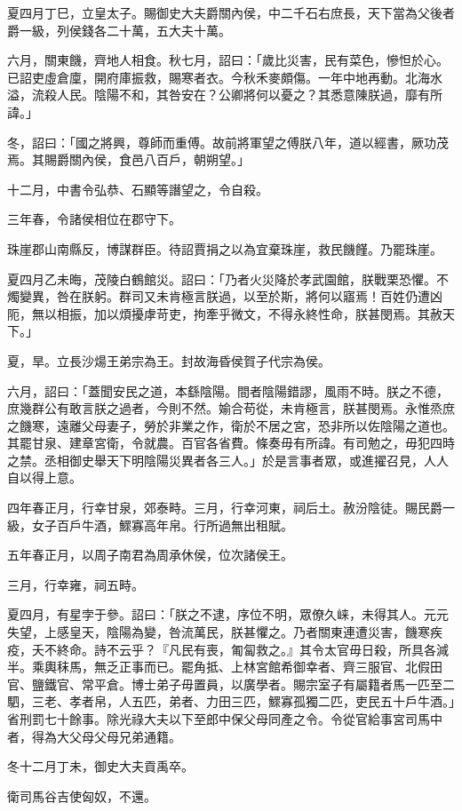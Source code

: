 \begin{pinyinscope}
夏四月丁巳，立皇太子。賜御史大夫爵關內侯，中二千石右庶長，天下當為父後者爵一級，列侯錢各二十萬，五大夫十萬。

六月，關東饑，齊地人相食。秋七月，詔曰：「歲比災害，民有菜色，慘怛於心。已詔吏虛倉廩，開府庫振救，賜寒者衣。今秋禾麥頗傷。一年中地再動。北海水溢，流殺人民。陰陽不和，其咎安在？公卿將何以憂之？其悉意陳朕過，靡有所諱。」

冬，詔曰：「國之將興，尊師而重傅。故前將軍望之傅朕八年，道以經書，厥功茂焉。其賜爵關內侯，食邑八百戶，朝朔望。」

十二月，中書令弘恭、石顯等譖望之，令自殺。

三年春，令諸侯相位在郡守下。

珠崖郡山南縣反，博謀群臣。待詔賈捐之以為宜棄珠崖，救民饑饉。乃罷珠崖。

夏四月乙未晦，茂陵白鶴館災。詔曰：「乃者火災降於孝武園館，朕戰栗恐懼。不燭變異，咎在朕躬。群司又未肯極言朕過，以至於斯，將何以寤焉！百姓仍遭凶阨，無以相振，加以煩擾虖苛吏，拘牽乎微文，不得永終性命，朕甚閔焉。其赦天下。」

夏，旱。立長沙煬王弟宗為王。封故海昏侯賀子代宗為侯。

六月，詔曰：「蓋聞安民之道，本繇陰陽。間者陰陽錯謬，風雨不時。朕之不德，庶幾群公有敢言朕之過者，今則不然。媮合苟從，未肯極言，朕甚閔焉。永惟烝庶之饑寒，遠離父母妻子，勞於非業之作，衛於不居之宮，恐非所以佐陰陽之道也。其罷甘泉、建章宮衛，令就農。百官各省費。條奏毋有所諱。有司勉之，毋犯四時之禁。丞相御史舉天下明陰陽災異者各三人。」於是言事者眾，或進擢召見，人人自以得上意。

四年春正月，行幸甘泉，郊泰畤。三月，行幸河東，祠后土。赦汾陰徒。賜民爵一級，女子百戶牛酒，鰥寡高年帛。行所過無出租賦。

五年春正月，以周子南君為周承休侯，位次諸侯王。

三月，行幸雍，祠五畤。

夏四月，有星孛于參。詔曰：「朕之不逮，序位不明，眾僚久崃，未得其人。元元失望，上感皇天，陰陽為變，咎流萬民，朕甚懼之。乃者關東連遭災害，饑寒疾疫，夭不終命。詩不云乎？『凡民有喪，匍匐救之。』其令太官毋日殺，所具各減半。乘輿秣馬，無乏正事而已。罷角抵、上林宮館希御幸者、齊三服官、北假田官、鹽鐵官、常平倉。博士弟子毋置員，以廣學者。賜宗室子有屬籍者馬一匹至二駟，三老、孝者帛，人五匹，弟者、力田三匹，鰥寡孤獨二匹，吏民五十戶牛酒。」省刑罰七十餘事。除光祿大夫以下至郎中保父母同產之令。令從官給事宮司馬中者，得為大父母父母兄弟通籍。

冬十二月丁未，御史大夫貢禹卒。

衛司馬谷吉使匈奴，不還。


\end{pinyinscope}

